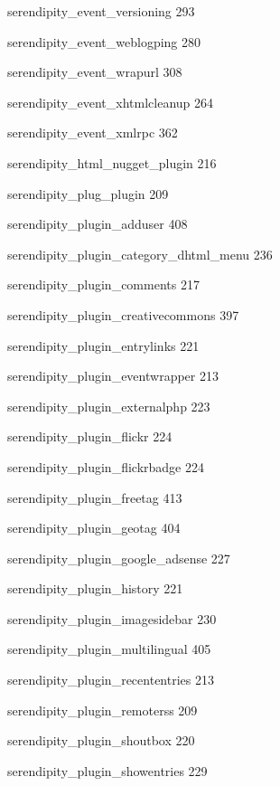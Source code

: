 \documentclass{book}
\renewcommand\subitem{\par}
\begin{document}
\begin{multicols}{2}
\begin{osp-index}
    \subitem serendipity\_event\_versioning\hspace{1mm} 293
    \subitem serendipity\_event\_weblogping\hspace{1mm} 280
    \subitem serendipity\_event\_wrapurl\hspace{1mm} 308
    \subitem serendipity\_event\_xhtmlcleanup\hspace{1mm} 264
    \subitem serendipity\_event\_xmlrpc\hspace{1mm} 362
    \subitem serendipity\_html\_nugget\_plugin\hspace{1mm} 216
    \subitem serendipity\_plug\_plugin\hspace{1mm} 209
    \subitem serendipity\_plugin\_adduser\hspace{1mm} 408
    \subitem serendipity\_plugin\_category\_dhtml\_menu\hspace{1mm} 236
    \subitem serendipity\_plugin\_comments\hspace{1mm} 217
    \subitem serendipity\_plugin\_creativecommons\hspace{1mm} 397
    \subitem serendipity\_plugin\_entrylinks\hspace{1mm} 221
    \subitem serendipity\_plugin\_eventwrapper\hspace{1mm} 213
    \subitem serendipity\_plugin\_externalphp\hspace{1mm} 223
    \subitem serendipity\_plugin\_flickr\hspace{1mm} 224
    \subitem serendipity\_plugin\_flickrbadge\hspace{1mm} 224
    \subitem serendipity\_plugin\_freetag\hspace{1mm} 413
    \subitem serendipity\_plugin\_geotag\hspace{1mm} 404
    \subitem serendipity\_plugin\_google\_adsense\hspace{1mm} 227
    \subitem serendipity\_plugin\_history\hspace{1mm} 221
    \subitem serendipity\_plugin\_imagesidebar\hspace{1mm} 230
    \subitem serendipity\_plugin\_multilingual\hspace{1mm} 405
    \subitem serendipity\_plugin\_recententries\hspace{1mm} 213
    \subitem serendipity\_plugin\_remoterss\hspace{1mm} 209
    \subitem serendipity\_plugin\_shoutbox\hspace{1mm} 220
    \subitem serendipity\_plugin\_showentries\hspace{1mm} 229

\end{osp-index}
\end{multicols}
\end{document}
